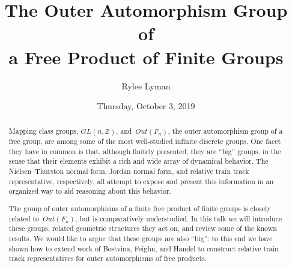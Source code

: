 \documentclass{UAmathtalk}
\author{Rylee Lyman}
\title{The Outer Automorphism Group of\\ a Free Product of Finite Groups}
\date{Thursday, October 3, 2019}
\begin{document}
\maketitle

\begin{abstract}
Mapping class groups, $GL(n,\mathbb{Z})$, and~$Out(F_n)$, the outer automorphism group of a free group, are among some of the most well-studied infinite discrete groups. One facet they have in common is that, although finitely presented, they are ``big'' groups, in the sense that their elements exhibit a rich and wide array of dynamical behavior. The Nielsen--Thurston normal form, Jordan normal form, and relative train track representative, respectively, all attempt to expose and present this information in an organized way to aid reasoning about this behavior.

The group of outer automorphisms of a finite free product of finite groups is closely related to~$Out(F_n)$, but is comparatively understudied. In this talk we will introduce these groups, related geometric structures they act on, and review some of the known results. We would like to argue that these groups are also ``big'': to this end we have shown how to extend work of Bestvina, Feighn, and Handel to construct relative train track representatives for outer automorphisms of free products.
\end{abstract}
\end{document}
